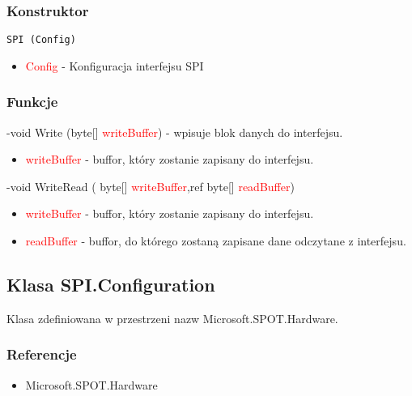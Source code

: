 \documentclass{article}
\begin{document}
\subsubsection{Konstruktor}
\begin{lstlisting}[frame=single]
SPI (Config)
\end{lstlisting}
\begin{itemize}
\item \textcolor{red}{Config} - Konfiguracja interfejsu SPI
\end{itemize}
\subsubsection{Funkcje}
-void Write (byte[] \textcolor{red}{writeBuffer}) - wpisuje blok danych do interfejsu.
\begin{itemize}
\item \textcolor{red}{writeBuffer} - buffor, który zostanie zapisany do interfejsu.
\end{itemize}
-void WriteRead ( byte[] \textcolor{red}{writeBuffer},ref byte[] \textcolor{red}{readBuffer})
\begin{itemize}
\item \textcolor{red}{writeBuffer} - buffor, który zostanie zapisany do interfejsu.
\item \textcolor{red}{readBuffer} - buffor, do którego zostaną zapisane dane odczytane z \newline interfejsu.
\end{itemize}

\subsection{Klasa SPI.Configuration}
Klasa zdefiniowana w przestrzeni nazw Microsoft.SPOT.Hardware. 
\subsubsection{Referencje}
\begin{itemize}
\item Microsoft.SPOT.Hardware
\end{itemize}
\end{document}

